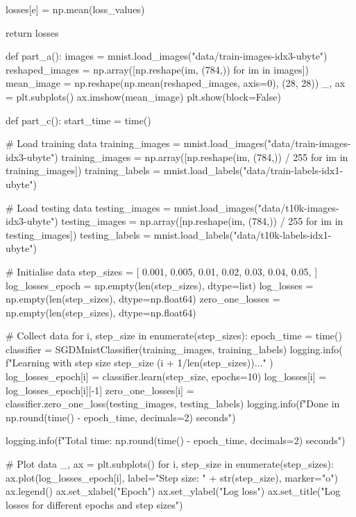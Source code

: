 \documentclass{exam}
\begin{document}
\begin{python}
                losses[e] = np.mean(loss_values)

            return losses


    def part_a():
        images = mnist.load_images("data/train-images-idx3-ubyte")
        reshaped_images = np.array([np.reshape(im, (784,)) for im in images])
        mean_image = np.reshape(np.mean(reshaped_images, axis=0), (28, 28))
        _, ax = plt.subplots()
        ax.imshow(mean_image)
        plt.show(block=False)


    def part_c():
        start_time = time()

        # Load training data
        training_images = mnist.load_images("data/train-images-idx3-ubyte")
        training_images = np.array([np.reshape(im, (784,)) / 255 for im in training_images])
        training_labels = mnist.load_labels("data/train-labels-idx1-ubyte")

        # Load testing data
        testing_images = mnist.load_images("data/t10k-images-idx3-ubyte")
        testing_images = np.array([np.reshape(im, (784,)) / 255 for im in testing_images])
        testing_labels = mnist.load_labels("data/t10k-labels-idx1-ubyte")

        # Initialise data
        step_sizes = [
            0.001,
            0.005,
            0.01,
            0.02,
            0.03,
            0.04,
            0.05,
        ]
        log_losses_epoch = np.empty(len(step_sizes), dtype=list)
        log_losses = np.empty(len(step_sizes), dtype=np.float64)
        zero_one_losses = np.empty(len(step_sizes), dtype=np.float64)

        # Collect data
        for i, step_size in enumerate(step_sizes):
            epoch_time = time()
            classifier = SGDMnistClassifier(training_images, training_labels)
            logging.info(
                f"Learning with step size {step_size} ({i + 1}/{len(step_sizes)})..."
            )
            log_losses_epoch[i] = classifier.learn(step_size, epochs=10)
            log_losses[i] = log_losses_epoch[i][-1]
            zero_one_losses[i] = classifier.zero_one_loss(testing_images, testing_labels)
            logging.info(f"Done in {np.round(time() - epoch_time, decimals=2)} seconds")

        logging.info(f"Total time: {np.round(time() - epoch_time, decimals=2)} seconds")

        # Plot data
        _, ax = plt.subplots()
        for i, step_size in enumerate(step_sizes):
            ax.plot(log_losses_epoch[i], label="Step size: " + str(step_size), marker="o")
        ax.legend()
        ax.set_xlabel("Epoch")
        ax.set_ylabel("Log loss")
        ax.set_title("Log losses for different epochs and step sizes")


\end{python}
\end{document}
